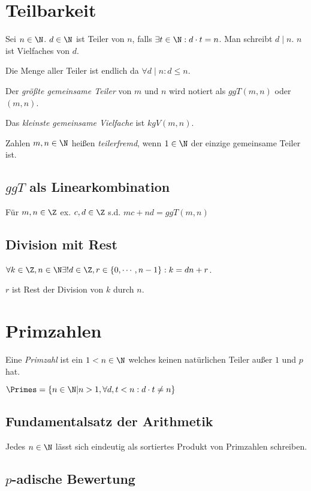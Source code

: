 \section*{Teilbarkeit}

Sei $n \in \N$. $d \in \N$ ist Teiler von $n$, falls $\exists t \in \N : d \cdot t = n$. Man schreibt $d \mid n$. $n$ ist Vielfaches von $d$.

Die Menge aller Teiler ist endlich da $\forall d \mid n : d \leq n$.

Der \emph{größte gemeinsame Teiler} von $m$ und $n$ wird notiert als $ggT(m,n)$ oder $(m,n)$.

Das \emph{kleinste gemeinsame Vielfache} ist $kgV(m,n)$.

Zahlen $m, n \in \N$ heißen \emph{teilerfremd}, wenn $1 \in \N$ der einzige gemeinsame Teiler ist.

\subsection*{$ggT$ als Linearkombination}

Für $m, n \in \Z$ ex. $c, d \in \Z$ s.d. $mc + nd = ggT(m,n)$

\subsection*{Division mit Rest}

$\forall k \in \Z, n \in \N \exists! d \in \Z, r \in \{0,\cdots,n-1\}: k = dn+r$.

$r$ ist Rest der Division von $k$ durch $n$.

\section*{Primzahlen}

Eine \emph{Primzahl} ist ein $1 < n \in \N$ welches keinen natürlichen Teiler außer $1$ und $p$ hat.

$\Primes = \{ n \in \N | n > 1, \forall d,t < n : d \cdot t \neq n \}$

\subsection*{Fundamentalsatz der Arithmetik}

Jedes $n \in \N$ lässt sich eindeutig als sortiertes Produkt von Primzahlen schreiben.

\subsection*{$p$-adische Bewertung}

